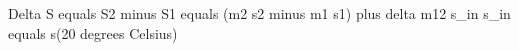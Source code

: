 Delta S equals S2 minus S1 equals (m2 s2 minus m1 s1) plus delta m12 s_in  
s_in equals s(20 degrees Celsius)